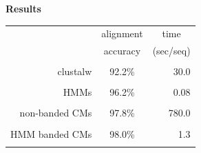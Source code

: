 \documentclass[landscape]{slides}
\begin{document}
\begin{slide}
\begin{center}
\large
\textbf{Results}
\end{center}
\medskip
\medskip
\begin{center}

\begin{tabular}{rcr} 
& \multicolumn{1}{c}{alignment} & \multicolumn{1}{c}{time} \\
& \multicolumn{1}{c}{accuracy} & \multicolumn{1}{c}{(sec/seq)} \\ \hline
& \multicolumn{1}{c}{} & \multicolumn{1}{c}{} \\
clustalw & 92.2\% & 30.0 \\ 
& \multicolumn{1}{c}{} & \multicolumn{1}{c}{} \\
HMMs & 96.2\% & 0.08 \\ 
& \multicolumn{1}{c}{} & \multicolumn{1}{c}{} \\
non-banded CMs & 97.8\% & 780.0 \\ 
& \multicolumn{1}{c}{} & \multicolumn{1}{c}{} \\
HMM banded CMs & 98.0\% & 1.3 \\ %
& \multicolumn{1}{c}{} & \multicolumn{1}{c}{} \\
\end{tabular}
\end{center}

\vfill
\end{slide}
\end{document}
